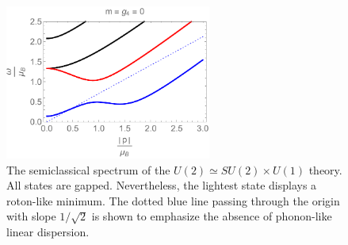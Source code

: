   \begin{figure}[h]
\begin{center}
\includegraphics[height=2.0in]{Chapter_3_Folder_1806.06976/figures/u2.pdf}
\end{center}
\caption{ \small{The semiclassical spectrum of the $U(2)\simeq SU(2)\times U(1)$ theory. All states are gapped. Nevertheless, the lightest state displays a roton-like minimum. The dotted blue line passing through the origin with slope $1/\sqrt 2$ is shown to emphasize the absence of  phonon-like linear dispersion.}}
\label{u2}
\end{figure}

 
